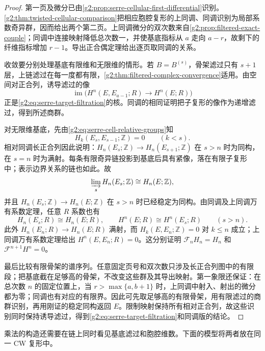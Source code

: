 \begin{proof}
	第一页及微分已由\cref{g2:prop:serre-cellular-first-differential}识别。\cref{g2:thm:twisted-cellular-comparison}把相应胞腔复形的上同调、同调识别为局部系数奇异群，因而给出两个第二页。上同调微分的双次数来自\cref{g2:prop:filtered-exact-couple}；同调中连接映射降低总次数一，并使基底指标从 \(a\) 走向 \(a-r\)，故剩下的纤维指标增加 \(r-1\)。导出正合偶定理给出逐页取同调的关系。

	收敛要分别处理基底有限维和无限维的情形。若 \(B=B^{(s)}\)，骨架滤过只有 \(s+1\) 层，上链滤过在每一度都有限，\cref{g2:thm:filtered-complex-convergence}适用。由空间对正合列，诱导滤过的像
	\[
		\operatorname{im}\bigl(H^n(E,E_{a-1};R)\to H^n(E;R)\bigr)
	\]
	正是\eqref{g2:eq:serre-target-filtration}的核。同调的相同证明把子复形的像作为递增滤过，得到所述商群。

	对无限维基底，先由\eqref{g2:eq:serre-cell-relative-groups}知
	\[
		H_k(E_s,E_{s-1};\mathbb Z)=0\qquad(k<s).
	\]
	相对同调长正合列因此说明：\(H_n(E_s;\mathbb Z)\to H_n(E_{s+1};\mathbb Z)\) 在 \(s>n\) 时为同构，在 \(s=n\) 时为满射。每条有限奇异链投影到基底后具有紧像，落在有限子复形中；表示边界关系的链也如此。故
	\[
		\varinjlim_s H_n(E_s;\mathbb Z)\cong H_n(E;\mathbb Z),
	\]
	并且 \(H_n(E_s;\mathbb Z)\to H_n(E;\mathbb Z)\) 在 \(s>n\) 时已经稳定为同构。由同调及上同调万有系数定理，任意 \(R\) 系数也有
	\[
		H_n(E_s;R)\cong H_n(E;R),\qquad H^n(E;R)\cong H^n(E_s;R)\qquad(s>n).
	\]
	此外 \(H_n(E_n;R)\to H_n(E;R)\) 满射，而 \(H_k(E,E_n;\mathbb Z)=0\) 对 \(k\le n\) 成立；上同调万有系数定理给出 \(H^n(E,E_n;R)=0\)。这分别证明 \(\mathcal F_nH_n=H_n\) 和 \(\mathcal F^{n+1}H^n=0\)。

	最后比较有限骨架的谱序列。任意固定页号和双次数只涉及长正合列图中的有限段；把基底截在足够高的骨架，不改变这些群及其导出映射。第一象限还保证：在总次数 \(n\) 的固定位置上，当 \(r>\max\{a,b+1\}\) 时，上同调中射入、射出的微分都为零；同调也有对应的有限界。因此可先取足够高的有限骨架，用有限滤过的商群识别，再用刚证的稳定同构返回 \(E\)。限制映射保持所有相对正合列，故这些识别同时保持诱导滤过，得到\eqref{g2:eq:serre-target-filtration}和同调版的结论。
\end{proof}

乘法的构造还需要在链上同时看见基底滤过和胞腔维数。下面的模型将两者放在同一 CW 复形中。

